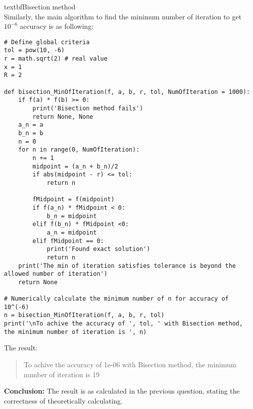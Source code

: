 textbf{Bisection method} \\
Similarly, the main algorithm to find the minimum number of iteration to get $10^{-6}$ accuracy is as following:
\begin{lstlisting}
# Define global criteria
tol = pow(10, -6)
r = math.sqrt(2) # real value
x = 1
R = 2

def bisection_MinOfIteration(f, a, b, r, tol, NumOfIteration = 1000):
    if f(a) * f(b) >= 0:
        print('Bisection method fails')
        return None, None
    a_n = a
    b_n = b
    n = 0
    for n in range(0, NumOfIteration):
        n += 1
        midpoint = (a_n + b_n)/2
        if abs(midpoint - r) <= tol:
            return n

        fMidpoint = f(midpoint)
        if f(a_n) * fMidpoint < 0:
            b_n = midpoint
        elif f(b_n) * fMidpoint <0:
            a_n = midpoint
        elif fMidpoint == 0:
            print('Found exact solution')
            return n
    print('The min of iteration satisfies tolerance is beyond the allowed number of iteration')
    return None

# Numerically calculate the minimum number of n for accuracy of 10^(-6)
n = bisection_MinOfIteration(f, a, b, r, tol)
print('\nTo achive the accuracy of ', tol, ' with Bisection method, the minimum number of iteration is ', n)
\end{lstlisting}
The result: 
\begin{quote}
    To achive the accuracy of  1e-06  with Bisection method, the minimum number of iteration is  19
\end{quote}

\textbf{Conclusion:} The result is as calculated in the previous question, stating the correctness of theoretically calculating.

\newpage

